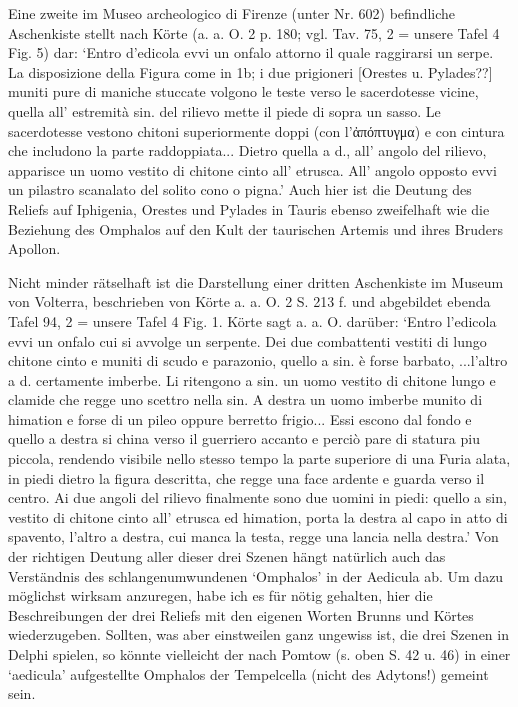 \documentclass[a4paper, 11pt, oneside]{article}
\begin{document}
Eine zweite im Museo archeologico di Firenze (unter Nr. 602) befindliche Aschenkiste stellt nach Körte (a. a. O. 2 p. 180; vgl. Tav. 75, 2 = unsere Tafel 4 Fig. 5) dar: `Entro d'edicola evvi un onfalo attorno il quale raggirarsi un serpe. La disposizione della Figura come in 1b; i due prigioneri [Orestes u. Pylades??] muniti pure di maniche stuccate volgono le teste verso le sacerdotesse vicine, quella all' estremità sin. del rilievo mette il piede di sopra un sasso. Le sacerdotesse vestono chitoni superiormente doppi (con l'ἀπόπτυγμα) e con cintura che includono la parte raddoppiata... Dietro quella a d., all' angolo del rilievo, apparisce un uomo vestito di chitone cinto all' etrusca. All' angolo opposto evvi un pilastro scanalato del solito cono o pigna.' Auch hier ist die Deutung des Reliefs auf Iphigenia, Orestes und Pylades in Tauris ebenso zweifelhaft wie die Beziehung des Omphalos auf den Kult der taurischen Artemis und ihres Bruders Apollon.

Nicht minder rätselhaft ist die Darstellung einer dritten Aschenkiste im Museum von Volterra, beschrieben von Körte a. a. O. 2 S. 213 f. und abgebildet ebenda Tafel 94, 2 = unsere Tafel 4 Fig. 1. Körte sagt a. a. O. darüber: `Entro l'edicola evvi un onfalo cui si avvolge un serpente. Dei due combattenti vestiti di lungo chitone cinto e muniti di scudo e parazonio, quello a sin. è forse barbato, ...l'altro a d. certamente imberbe. Li ritengono a sin. un uomo vestito di chitone lungo e clamide che regge uno scettro nella sin. A destra un uomo imberbe munito di himation e forse di un pileo oppure berretto frigio... Essi escono dal fondo e quello a destra si china verso il guerriero accanto e perciò pare di statura piu piccola, rendendo visibile nello stesso tempo la parte superiore di una Furia alata, in piedi dietro la figura descritta, che regge una face ardente e guarda verso il centro. Ai due angoli del rilievo finalmente sono due uomini in piedi: quello a sin, vestito di chitone cinto all' etrusca ed himation, porta la destra al capo in atto di spavento, l'altro a destra, cui manca la testa, regge una lancia nella destra.' Von der richtigen Deutung aller dieser drei Szenen hängt natürlich auch das Verständnis des schlangenumwundenen `Omphalos' in der Aedicula ab. Um dazu möglichst wirksam anzuregen, habe ich es für nötig gehalten, hier die Beschreibungen der drei Reliefs mit den eigenen Worten Brunns und Körtes wiederzugeben. Sollten, was aber einstweilen ganz ungewiss ist, die drei Szenen in Delphi spielen, so könnte vielleicht der nach Pomtow (s. oben S. 42 u. 46) in einer `aedicula' aufgestellte Omphalos der Tempelcella (nicht des Adytons!) gemeint sein.
\end{document}
